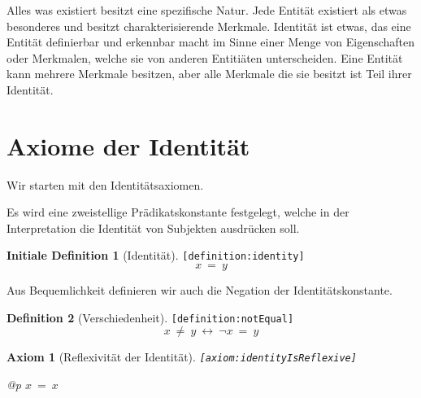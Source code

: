 \documentclass[a4paper,german,10pt,twoside]{book}
\newtheorem{ax}{Axiom}
\theoremstyle{definition}
\newtheorem{defn}{Definition}
\newtheorem{idefn}[defn]{Initiale Definition}
\theoremstyle{remark}
\begin{document}
Alles was existiert besitzt eine spezifische Natur. Jede Entit{\"a}t existiert als etwas besonderes und besitzt charakterisierende Merkmale. Identit{\"a}t ist etwas, das eine Entit{\"a}t definierbar und erkennbar macht im Sinne einer Menge von Eigenschaften oder Merkmalen, welche sie von anderen Entiti{\"a}ten unterscheiden. Eine Entit{\"a}t kann mehrere Merkmale besitzen, aber alle Merkmale die sie besitzt ist Teil ihrer Identit{\"a}t.

\section{Axiome der Identit{\"a}t} \label{chapter7_section1} \hypertarget{chapter7_section1}{}
Wir starten mit den Identit{\"a}tsaxiomen.

\par
Es wird eine zweistellige Pr{\"a}dikatskonstante festgelegt, welche in der Interpretation die Identit{\"a}t von Subjekten ausdr{\"u}cken soll.

\begin{idefn}[Identit{\"a}t]
\label{definition:identity} \hypertarget{definition:identity}{}
{\tt \tiny [\verb]definition:identity]]}
$$x \ = \ y
$$

\end{idefn}


\par
Aus Bequemlichkeit definieren wir auch die Negation der Identit{\"a}tskonstante.

\begin{defn}[Verschiedenheit]
\label{definition:notEqual} \hypertarget{definition:notEqual}{}
{\tt \tiny [\verb]definition:notEqual]]}
$$x \ \neq \ y\ \leftrightarrow\ \neg x \ = \ y$$

\end{defn}


\begin{ax}[Reflexivit{\"a}t der Identit{\"a}t]
\label{axiom:identityIsReflexive} \hypertarget{axiom:identityIsReflexive}{}
{\tt \tiny [\verb]axiom:identityIsReflexive]]}
\mbox{}
\begin{longtable}{{@{\extracolsep{\fill}}p{\linewidth}}}
\centering $x \ = \ x$
\end{longtable}

\end{ax}
\end{document}
